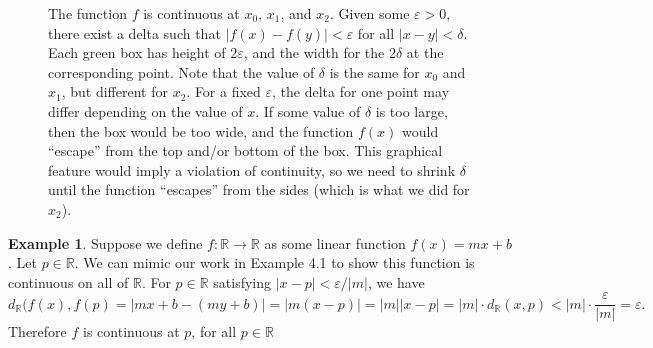 \documentclass{article}
\newcommand{\R}{\mathbb{R}}
\theoremstyle{definition}
\newtheorem{example}{Example}[section]
\begin{document}
\begin{figure}[h!]
	\centering
	\caption{The function $ f $ is continuous at $ x_0 $, $ x_1 $, and $ x_2 $. Given some $ \varepsilon>0 $, there exist a delta such that $ |f(x)-f(y)|<\varepsilon $ for all $ |x-y|<\delta $. Each green box has height of $ 2\varepsilon $, and the width for the $ 2\delta $ at the corresponding point. Note that the value of $ \delta $ is the same for $ x_0 $ and $ x_1 $, but different for $ x_2 $. For a fixed $ \varepsilon $, the delta for one point may differ depending on the value of $ x $. If some value of $ \delta $ is too large, then the box would be too wide, and the function $ f(x) $ would ``escape'' from the top and/or bottom of the box. This graphical feature would imply a violation of continuity, so we need to shrink $ \delta $ until the function ``escapes'' from the sides (which is what we did for $ x_2 $).   }
\end{figure}
\begin{example}
	Suppose we define $ f:\R\to\R $ as some linear function $ f(x)=mx+b $. Let $ p\in\R $. We can mimic our work in Example 4.1 to show this function is continuous on all of $ \R $. For $ p\in\R $ satisfying $ |x-p|<\varepsilon/|m| $, we have$$ d_\R(f(x),f(p)=|mx+b-(my+b)|=|m(x-p)|=|m||x-p|=|m|\cdot d_\R(x,p)<|m|\cdot\frac{\varepsilon}{|m|}=\varepsilon .$$ Therefore $ f $ is continuous at $ p $, for all $ p\in\R $
\end{example}
\end{document}
